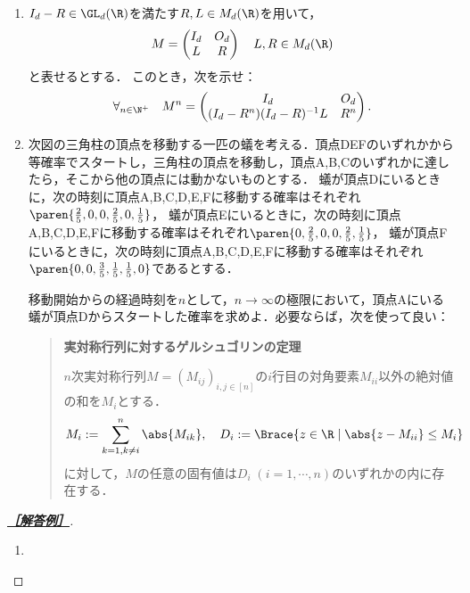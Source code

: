 \documentclass[uplatex,dvipdfmx]{jsarticle}
\begin{document}
\begin{tcolorbox}[colframe=ForestGreen, colback=ForestGreen!10!white,breakable,colbacktitle=ForestGreen!40!white,coltitle=black,fonttitle=\bfseries\sffamily,
    title=第４問]
    \begin{enumerate}
        \item $I_d-R\in\GL_d(\R)$を満たす$R,L\in M_d(\R)$を用いて，
        \[M=\begin{pmatrix}
            I_d&O_d\\L&R
        \end{pmatrix}\quad L,R\in M_d(\R)\]
        と表せるとする．
        このとき，次を示せ：
        \[\forall_{n\in\N^+}\quad M^n=\begin{pmatrix}I_d&O_d\\(I_d-R^n)(I_d-R)^{-1}L&R^n\end{pmatrix}.\]
        \item 次図の三角柱の頂点を移動する一匹の蟻を考える．頂点DEFのいずれかから等確率でスタートし，三角柱の頂点を移動し，頂点A,B,Cのいずれかに達したら，そこから他の頂点には動かないものとする．
        蟻が頂点Dにいるときに，次の時刻に頂点A,B,C,D,E,Fに移動する確率はそれぞれ$\paren{\frac{2}{5},0,0,\frac{2}{5},0,\frac{1}{5}}$，
        蟻が頂点Eにいるときに，次の時刻に頂点A,B,C,D,E,Fに移動する確率はそれぞれ$\paren{0,\frac{2}{5},0,0,\frac{2}{5},\frac{1}{5}}$，
        蟻が頂点Fにいるときに，次の時刻に頂点A,B,C,D,E,Fに移動する確率はそれぞれ$\paren{0,0,\frac{3}{5},\frac{1}{5},\frac{1}{5},0}$であるとする．
        
        \begin{center}
        \end{center}

        移動開始からの経過時刻を$n$として，$n\to\infty$の極限において，頂点Aにいる蟻が頂点Dからスタートした確率を求めよ．必要ならば，次を使って良い：
        \begin{quote}
            \textbf{実対称行列に対するゲルシュゴリンの定理}

            $n$次実対称行列$M=(M_{ij})_{i,j\in[n]}$の$i$行目の対角要素$M_{ii}$以外の絶対値の和を$M_i$とする．
            \[M_i:=\sum_{k=1,k\ne i}^n\abs{M_{ik}},\quad D_i:=\Brace{z\in\R\mid\abs{z-M_{ii}}\le M_i}\]
            に対して，$M$の任意の固有値は$D_i\;(i=1,\cdots,n)$のいずれかの内に存在する．
        \end{quote}
    \end{enumerate}
\end{tcolorbox}
\begin{proof}[\textbf{\underline{［解答例］}}]\mbox{}
    \begin{enumerate}
        \item 
    \end{enumerate}
\end{proof}
\end{document}
